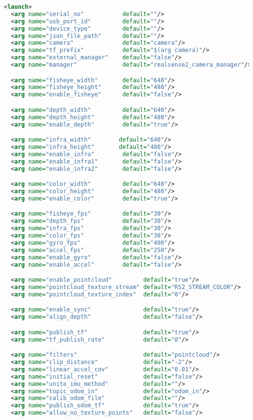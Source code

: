 \documentclass[{../../master}]{subfiles}
\begin{document}
\begin{lstlisting}[language=XML, label=code:realsense_launch, caption=\textsf{realsense.launch}]
<launch>
  <arg name="serial_no"           default=""/>
  <arg name="usb_port_id"         default=""/>
  <arg name="device_type"         default=""/>
  <arg name="json_file_path"      default=""/>
  <arg name="camera"              default="camera"/>
  <arg name="tf_prefix"           default="$(arg camera)"/>
  <arg name="external_manager"    default="false"/>
  <arg name="manager"             default="realsense2_camera_manager"/>

  <arg name="fisheye_width"       default="640"/>
  <arg name="fisheye_height"      default="480"/>
  <arg name="enable_fisheye"      default="false"/>

  <arg name="depth_width"         default="640"/>
  <arg name="depth_height"        default="480"/>
  <arg name="enable_depth"        default="true"/>

  <arg name="infra_width"        default="640"/>
  <arg name="infra_height"       default="480"/>
  <arg name="enable_infra"        default="false"/>
  <arg name="enable_infra1"       default="false"/>
  <arg name="enable_infra2"       default="false"/>

  <arg name="color_width"         default="640"/>
  <arg name="color_height"        default="480"/>
  <arg name="enable_color"        default="true"/>

  <arg name="fisheye_fps"         default="30"/>
  <arg name="depth_fps"           default="30"/>
  <arg name="infra_fps"           default="30"/>
  <arg name="color_fps"           default="30"/>
  <arg name="gyro_fps"            default="400"/>
  <arg name="accel_fps"           default="250"/>
  <arg name="enable_gyro"         default="false"/>
  <arg name="enable_accel"        default="false"/>

  <arg name="enable_pointcloud"         default="true"/>
  <arg name="pointcloud_texture_stream" default="RS2_STREAM_COLOR"/>
  <arg name="pointcloud_texture_index"  default="0"/>

  <arg name="enable_sync"               default="true"/>
  <arg name="align_depth"               default="false"/>

  <arg name="publish_tf"                default="true"/>
  <arg name="tf_publish_rate"           default="0"/>

  <arg name="filters"                   default="pointcloud"/>
  <arg name="clip_distance"             default="-2"/>
  <arg name="linear_accel_cov"          default="0.01"/>
  <arg name="initial_reset"             default="false"/>
  <arg name="unite_imu_method"          default=""/>
  <arg name="topic_odom_in"             default="odom_in"/>
  <arg name="calib_odom_file"           default=""/>
  <arg name="publish_odom_tf"           default="true"/>
  <arg name="allow_no_texture_points"   default="false"/>


\end{lstlisting}
\end{document}
